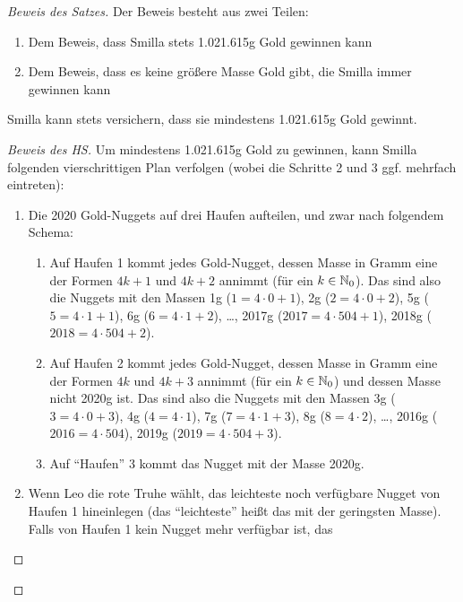 \begin{proof}[Beweis des Satzes]
    Der Beweis besteht aus zwei Teilen:
    \begin{enumerate}
        \item Dem Beweis, dass Smilla stets 1.021.615g Gold gewinnen kann
        \item Dem Beweis, dass es keine größere Masse Gold gibt, die Smilla immer gewinnen kann
    \end{enumerate}
    \renewcommand{\qedsymbol}{$\square$}
    \begin{lem}\label{smilla}
        Smilla kann stets versichern, dass sie mindestens 1.021.615g Gold gewinnt.
    \end{lem}
    \begin{proof}[Beweis des HS]
        Um mindestens 1.021.615g Gold zu gewinnen, kann Smilla folgenden vierschrittigen Plan verfolgen (wobei die 
        Schritte 2 und 3 ggf. mehrfach eintreten):
        \begin{enumerate}
            \item Die 2020 Gold-Nuggets auf drei Haufen aufteilen, und zwar nach folgendem Schema:
            \begin{enumerate}
                \item Auf Haufen 1 kommt jedes Gold-Nugget, dessen Masse in Gramm eine der Formen $4k+1$ und $4k+2$ 
                annimmt (für ein $k \in \mathbb{N}_0$). Das sind also die Nuggets mit den Massen 1g ($1 = 4 \cdot 0+1$), 2g 
                ($2 = 4\cdot 0+2$), 5g ($5 = 4 \cdot 1+1$), 6g ($6=4\cdot 1+2$), \dots, 2017g ($2017=4\cdot 504+1$), 
                2018g ($2018=4\cdot 504+2$).
                \item Auf Haufen 2 kommt jedes Gold-Nugget, dessen Masse in Gramm eine der Formen $4k$ und $4k+3$ 
                annimmt (für ein $k \in \mathbb{N}_0$) und dessen Masse nicht 2020g ist. Das sind also die Nuggets mit den 
                Massen 3g ($3=4\cdot 0+3$), 4g ($4=4\cdot 1$), 7g ($7=4\cdot 1+3$), 8g ($8=4\cdot 2$), \dots, 2016g 
                ($2016=4\cdot 504$), 2019g ($2019=4\cdot 504+3$).
                \item Auf "`Haufen"' 3 kommt das Nugget mit der Masse 2020g.
            \end{enumerate}
            \item Wenn Leo die rote Truhe wählt, das leichteste noch verfügbare Nugget von Haufen 1 hineinlegen (das 
            "`leichteste"' heißt das mit der geringsten Masse). Falls von Haufen 1 kein Nugget mehr verfügbar ist, das 

\end{enumerate}
\end{proof}
\end{proof}
